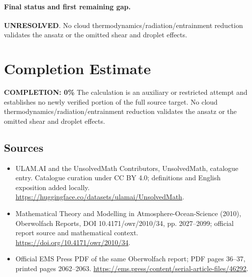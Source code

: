\documentclass[11pt]{article}
\begin{document}
\paragraph{Final status and first remaining gap.}
\textbf{UNRESOLVED}. No cloud thermodynamics/radiation/entrainment reduction validates the ansatz or the omitted shear and droplet effects.

\section{Completion Estimate}
\noindent\textbf{COMPLETION: 0\%}
The calculation is an auxiliary or restricted attempt and establishes no newly verified portion of the full source target. No cloud thermodynamics/radiation/entrainment reduction validates the ansatz or the omitted shear and droplet effects.

\subsection{Sources}
\begin{itemize}
\item[\hypertarget{source:statement:1}{S1}] ULAM.AI and the UnsolvedMath Contributors, UnsolvedMath, catalogue entry. Catalogue curation under CC BY 4.0; definitions and English exposition added locally.
\url{https://huggingface.co/datasets/ulamai/UnsolvedMath}.
\item[\hypertarget{source:statement:2}{S2}] Mathematical Theory and Modelling in Atmosphere-Ocean-Science (2010), Oberwolfach Reports, DOI 10.4171/owr/2010/34, pp. 2027--2099; official report source and mathematical context.
\url{https://doi.org/10.4171/owr/2010/34}.
\item[\hypertarget{source:statement:3}{S3}] Official EMS Press PDF of the same Oberwolfach report; PDF pages 36--37, printed pages 2062--2063.
\url{https://ems.press/content/serial-article-files/46292}.
\end{itemize}
\label{end:statement}
\end{document}
